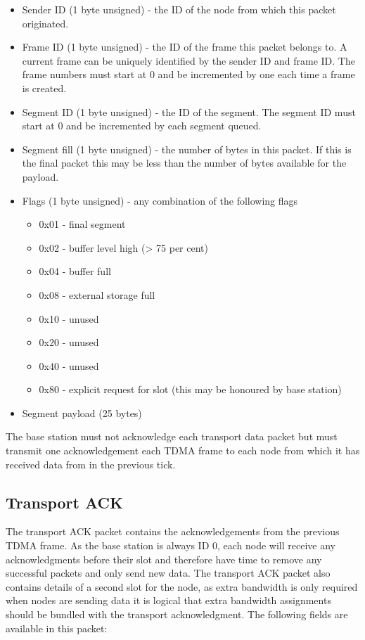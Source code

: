 \documentclass[parskip]{cs4rep}
\begin{document}
\begin{itemize}
\item
Sender ID (1 byte unsigned) - the ID of the node from which this packet originated.
\item
Frame ID (1 byte unsigned) - the ID of the frame this packet belongs to. A current frame can be uniquely identified by the sender ID and frame ID. The frame numbers must start at 0 and be incremented by one each time a frame is created.
\item
Segment ID (1 byte unsigned) - the ID of the segment. The segment ID must start at 0 and be incremented by each segment queued.
\item
Segment fill (1 byte unsigned) - the number of bytes in this packet. If this is the final packet this may be less than the number of bytes available for the payload.
\item
Flags (1 byte unsigned) - any combination of the following flags
\begin{itemize}
\item
0x01 - final segment
\item
0x02 - buffer level high (> 75 per cent)
\item
0x04 - buffer full
\item
0x08 - external storage full
\item
0x10 - unused
\item
0x20 - unused
\item
0x40 - unused
\item
0x80 - explicit request for slot (this may be honoured by base station)
\end{itemize}
\item
Segment payload (25 bytes)
\end{itemize}

The base station must not acknowledge each transport data packet but must transmit one acknowledgement each TDMA frame to each node from which it has received data from in the previous tick.

\subsection{Transport ACK}

The transport ACK packet contains the acknowledgements from the previous TDMA frame. As the base station is always ID 0, each node will receive any acknowledgments before their slot and therefore have time to remove any successful packets and only send new data. The transport ACK packet also contains details of a second slot for the node, as extra bandwidth is only required when nodes are sending data it is logical that extra bandwidth assignments should be bundled with the transport acknowledgment. The following fields are available in this packet:
\end{document}
